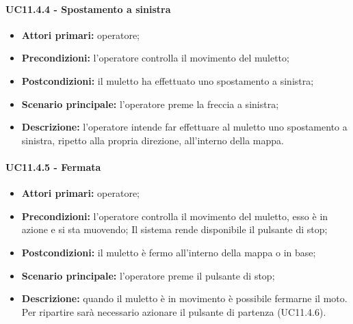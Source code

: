 \paragraph{UC11.4.4 - Spostamento a sinistra}
\begin{itemize}
	\item 	\textbf{Attori primari:} operatore;
	\item 	\textbf{Precondizioni:} l'operatore controlla il movimento del muletto;
	\item 	\textbf{Postcondizioni:} il muletto ha effettuato uno spostamento a sinistra; 
	\item 	\textbf{Scenario principale:} l'operatore preme la freccia a sinistra;
	\item 	\textbf{Descrizione:} l'operatore intende far effettuare al muletto uno spostamento a sinistra, ripetto alla propria direzione, all'interno della mappa.
\end{itemize}


\paragraph{UC11.4.5 - Fermata}
\begin{itemize}
	\item 	\textbf{Attori primari:} operatore;
	\item 	\textbf{Precondizioni:} l'operatore controlla il movimento del muletto, esso è in azione e si sta muovendo; Il sistema rende disponibile il pulsante di stop;
	\item 	\textbf{Postcondizioni:} il muletto è fermo all'interno della mappa o in base;
	\item 	\textbf{Scenario principale:} l'operatore preme il pulsante di stop;
	\item 	\textbf{Descrizione:} quando il muletto è in movimento è possibile fermarne il moto. Per ripartire sarà necessario azionare il pulsante di partenza (UC11.4.6).
\end{itemize}


